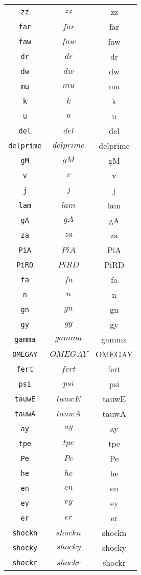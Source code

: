 \begin{center}
\begin{longtable}{ccc}
\texttt{zz} & $zz$ & zz\\
\texttt{far} & $far$ & far\\
\texttt{faw} & $faw$ & faw\\
\texttt{dr} & $dr$ & dr\\
\texttt{dw} & $dw$ & dw\\
\texttt{mu} & $mu$ & mu\\
\texttt{k} & $k$ & k\\
\texttt{u} & $u$ & u\\
\texttt{del} & $del$ & del\\
\texttt{delprime} & $delprime$ & delprime\\
\texttt{gM} & $gM$ & gM\\
\texttt{v} & $v$ & v\\
\texttt{j} & $j$ & j\\
\texttt{lam} & $lam$ & lam\\
\texttt{gA} & $gA$ & gA\\
\texttt{za} & $za$ & za\\
\texttt{PiA} & $PiA$ & PiA\\
\texttt{PiRD} & $PiRD$ & PiRD\\
\texttt{fa} & $fa$ & fa\\
\texttt{n} & $n$ & n\\
\texttt{gn} & $gn$ & gn\\
\texttt{gy} & $gy$ & gy\\
\texttt{gamma} & $gamma$ & gamma\\
\texttt{OMEGAY} & $OMEGAY$ & OMEGAY\\
\texttt{fert} & $fert$ & fert\\
\texttt{psi} & $psi$ & psi\\
\texttt{tauwE} & $tauwE$ & tauwE\\
\texttt{tauwA} & $tauwA$ & tauwA\\
\texttt{ay} & $ay$ & ay\\
\texttt{tpe} & $tpe$ & tpe\\
\texttt{Pe} & $Pe$ & Pe\\
\texttt{he} & $he$ & he\\
\texttt{en} & $en$ & en\\
\texttt{ey} & $ey$ & ey\\
\texttt{er} & $er$ & er\\
\texttt{shockn} & $shockn$ & shockn\\
\texttt{shocky} & $shocky$ & shocky\\
\texttt{shockr} & $shockr$ & shockr\\

\end{longtable}
\end{center}
